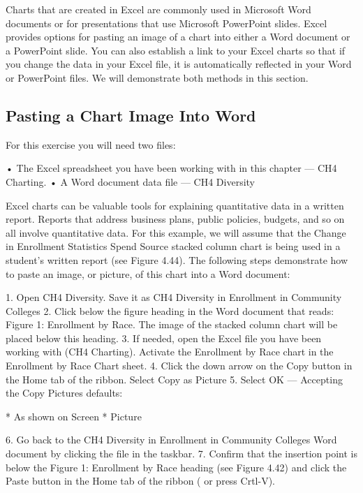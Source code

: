 Charts that are created in Excel are commonly used in Microsoft Word documents or for
presentations that use Microsoft PowerPoint slides. Excel provides options for pasting an image of a
chart into either a Word document or a PowerPoint slide. You can also establish a link to your Excel
charts so that if you change the data in your Excel file, it is automatically reflected in your Word or
PowerPoint files. We will demonstrate both methods in this section.

\subsection{Pasting a Chart Image Into Word}

For this exercise you will need two files:

• The Excel spreadsheet you have been working with in this chapter — CH4 Charting.
• A Word document data file — CH4 Diversity

Excel charts can be valuable tools for explaining quantitative data in a written report. Reports that
address business plans, public policies, budgets, and so on all involve quantitative data. For this
example, we will assume that the Change in Enrollment Statistics Spend Source stacked column chart
is being used in a student’s written report (see Figure 4.44). The following steps demonstrate how to
paste an image, or picture, of this chart into a Word document:

1. Open CH4 Diversity. Save it as CH4 Diversity in Enrollment in Community Colleges
2. Click below the figure heading in the Word document that reads: Figure 1: Enrollment by
Race. The image of the stacked column chart will be placed below this heading.
3. If needed, open the Excel file you have been working with (CH4 Charting). Activate the
Enrollment by Race chart in the Enrollment by Race Chart sheet.
4. Click the down arrow on the Copy button in the Home tab of the ribbon. Select Copy as
Picture
5. Select OK — Accepting the Copy Pictures defaults:


* As shown on Screen
* Picture

6. Go back to the CH4 Diversity in Enrollment in Community Colleges Word document by clicking the
file in the taskbar.
7. Confirm that the insertion point is below the Figure 1: Enrollment by Race heading (see Figure
4.42) and click the Paste button in the Home tab of the ribbon ( or press Crtl-V).


